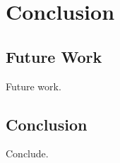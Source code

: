 \chapter{Conclusion}
\label{chap:conclusion}

\section{Future Work}
\label{sec:conclusion/future}
Future work.

\section{Conclusion}
\label{sec:conclusion/conclusion}

Conclude.